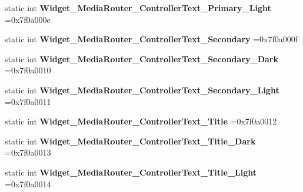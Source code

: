 \begin{DoxyCompactItemize}
static int {\bfseries Widget\+\_\+\+Media\+Router\+\_\+\+Controller\+Text\+\_\+\+Primary\+\_\+\+Light} =0x7f0a000e
\item 
\mbox{\label{classandroid_1_1support_1_1graphics_1_1drawable_1_1animated_1_1R_1_1style_a13aae5ee06f4b1fc47c3a602b341129b}} 
static int {\bfseries Widget\+\_\+\+Media\+Router\+\_\+\+Controller\+Text\+\_\+\+Secondary} =0x7f0a000f
\item 
\mbox{\label{classandroid_1_1support_1_1graphics_1_1drawable_1_1animated_1_1R_1_1style_a7cd1fc284d2a8a12e0083f6db5ee0677}} 
static int {\bfseries Widget\+\_\+\+Media\+Router\+\_\+\+Controller\+Text\+\_\+\+Secondary\+\_\+\+Dark} =0x7f0a0010
\item 
\mbox{\label{classandroid_1_1support_1_1graphics_1_1drawable_1_1animated_1_1R_1_1style_a35477d0344329460e025121b43c80060}} 
static int {\bfseries Widget\+\_\+\+Media\+Router\+\_\+\+Controller\+Text\+\_\+\+Secondary\+\_\+\+Light} =0x7f0a0011
\item 
\mbox{\label{classandroid_1_1support_1_1graphics_1_1drawable_1_1animated_1_1R_1_1style_a14036cd36c1d695b13f84ab93cbcbec5}} 
static int {\bfseries Widget\+\_\+\+Media\+Router\+\_\+\+Controller\+Text\+\_\+\+Title} =0x7f0a0012
\item 
\mbox{\label{classandroid_1_1support_1_1graphics_1_1drawable_1_1animated_1_1R_1_1style_af8f5a883efbbca341233672624521dd8}} 
static int {\bfseries Widget\+\_\+\+Media\+Router\+\_\+\+Controller\+Text\+\_\+\+Title\+\_\+\+Dark} =0x7f0a0013
\item 
\mbox{\label{classandroid_1_1support_1_1graphics_1_1drawable_1_1animated_1_1R_1_1style_a10e64bffb97031233e5466dc39b96334}} 
static int {\bfseries Widget\+\_\+\+Media\+Router\+\_\+\+Controller\+Text\+\_\+\+Title\+\_\+\+Light} =0x7f0a0014
\item 
\mbox{\label{classandroid_1_1support_1_1graphics_1_1drawable_1_1animated_1_1R_1_1style_ada2ed5136ba1015d430d61cd8e7a6768}} 

\end{DoxyCompactItemize}
